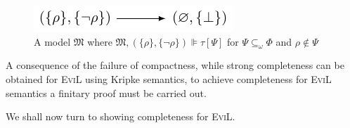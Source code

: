 \begin{figure}[ht]
\centering
  \includegraphics[]{evil_pictures/forth_fig.pdf}
\caption{A model $\mathfrak{M}$ where $\mathfrak{M}, (\{\rho\}, \{\neg
  \rho\}) \VDash \tau[\Psi]$ for $\Psi \subseteq_\omega \Phi$ and $\rho \nin \Psi$}
\label{fig:failureofcompactness}
\end{figure}

A consequence of the failure of compactness, while strong
completeness can be obtained for \textsc{EviL} using Kripke semantics,
to achieve completeness for \textsc{EviL} semantics a finitary proof
must be carried out.

We shall now turn to showing completeness for \textsc{EviL}.


